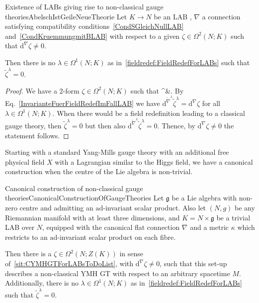 \documentclass[preprint]{elsarticle}
\def\bas#1\eas{\begin{align*}#1\end{align*}}
\theoremstyle{plain}
\theoremstyle{remark}
\theoremstyle{definition}
\begin{document}
\begin{theorems}{Existence of LABs giving rise to non-classical gauge theories}{AbelschIstGeileNeueTheorie}
Let $K \to N$ be an LAB , $\nabla$ a connection satisfying compatibility conditions~\eqref{CondSGleichNullLAB} and~\eqref{CondKruemmungmitBLAB} with respect to a given $\zeta \in \Omega^2(N; K)$ such that $\mathrm{d}^\nabla \zeta \neq 0$.

Then there is no $\lambda\in\Omega^1(N;K)$ as in~\ref{fieldredef:FieldRedefForLABs} such that $\widetilde{\zeta}^\lambda = 0$.
\end{theorems}

\begin{proof}
\leavevmode\newline
We have a 2-form $\zeta \in \Omega^2(N; K)$ such that
\bas
\mathrm{d}^\nabla \zeta &.
\eas
By Eq.~\eqref{InvarianteFuerFieldRedefImFallLAB} we have $\mathrm{d}^{\widetilde{\nabla}^\lambda} \widetilde{\zeta}^\lambda= \mathrm{d}^\nabla \zeta$ for all $\lambda \in \Omega^1(N;K)$. When there would be a field redefinition leading to a classical gauge theory, then $\widetilde{\zeta}^\lambda = 0$ but then also $\mathrm{d}^{\widetilde{\nabla}^\lambda} \widetilde{\zeta}^\lambda = 0$. Thence, by $\mathrm{d}^\nabla \zeta \neq 0$ the statement follows.
\end{proof}

Starting with a standard Yang-Mills gauge theory with an additional free physical field $X$ with a Lagrangian similar to the Higgs field, we have a canonical construction when the centre of the Lie algebra is non-trivial.

\begin{corollaries}{Canonical construction of non-classical gauge theories}{CanonicalConstructionOfGaugeTheories}
Let $\mathfrak{g}$ be a Lie algebra with non-zero centre and admitting an $\mathrm{ad}$-invariant scalar product. Also let $(N, g)$ be any Riemannian manifold with at least three dimensions, and $K = N \times \mathfrak{g}$ be a trivial LAB over $N$, equipped with the canonical flat connection $\nabla$ and a metric $\kappa$ which restricts to an $\mathrm{ad}$-invariant scalar product on each fibre.

Then there is a $\zeta \in \Omega^2(N; Z(K))$ in sense of~\ref{sit:CYMHGTForLABsToDoList}, with $\mathrm{d}^\nabla \zeta \neq 0$, such that this set-up describes a non-classical YMH GT with respect to an arbitrary spacetime $M$. Additionally, there is no $\lambda\in\Omega^1(N;K)$ as in~\ref{fieldredef:FieldRedefForLABs} such that $\widetilde{\zeta}^\lambda = 0$.
\end{corollaries}
\end{document}
